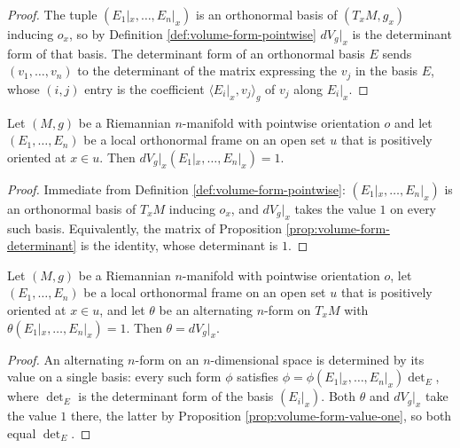 \begin{proof}
\leanok
{}
The tuple $(E_1|_x, \ldots, E_n|_x)$ is an orthonormal basis of $(T_x M, g_x)$ inducing $o_x$, so
by Definition \ref{def:volume-form-pointwise} $dV_g|_x$ is the determinant form of that basis.
The determinant form of an orthonormal basis $E$ sends $(v_1,\ldots,v_n)$ to the determinant of
the matrix expressing the $v_j$ in the basis $E$, whose $(i,j)$ entry is the coefficient
$\langle E_i|_x, v_j \rangle_g$ of $v_j$ along $E_i|_x$.
\end{proof}

\begin{proposition}
\label{prop:volume-form-value-one}
\leanok
{}
Let $(M,g)$ be a Riemannian $n$-manifold with pointwise orientation $o$ and let
$(E_1, \ldots, E_n)$ be a local orthonormal frame on an open set $u$ that is positively oriented
at $x \in u$. Then $dV_g|_x(E_1|_x, \ldots, E_n|_x) = 1$.
\end{proposition}

\begin{proof}
\leanok
{}
Immediate from Definition \ref{def:volume-form-pointwise}: $(E_1|_x, \ldots, E_n|_x)$ is an
orthonormal basis of $T_x M$ inducing $o_x$, and $dV_g|_x$ takes the value $1$ on every such
basis. Equivalently, the matrix of Proposition \ref{prop:volume-form-determinant} is the
identity, whose determinant is $1$.
\end{proof}

\begin{proposition}[Uniqueness of $dV_g$]
\label{prop:volume-form-uniqueness}
\leanok
{}
Let $(M,g)$ be a Riemannian $n$-manifold with pointwise orientation $o$, let $(E_1,\ldots,E_n)$
be a local orthonormal frame on an open set $u$ that is positively oriented at $x \in u$, and let
$\theta$ be an alternating $n$-form on $T_x M$ with $\theta(E_1|_x, \ldots, E_n|_x) = 1$. Then
$\theta = dV_g|_x$.
\end{proposition}

\begin{proof}
\leanok
{}
An alternating $n$-form on an $n$-dimensional space is determined by its value on a single
basis: every such form $\phi$ satisfies $\phi = \phi(E_1|_x,\ldots,E_n|_x) \det\nolimits_E$,
where $\det_E$ is the determinant form of the basis $(E_i|_x)$. Both $\theta$ and $dV_g|_x$ take
the value $1$ there, the latter by Proposition \ref{prop:volume-form-value-one}, so both equal
$\det_E$.
\end{proof}

